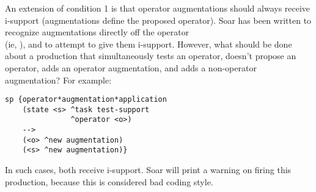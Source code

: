 An extension of condition 1 is that operator augmentations should always receive i-support (augmentations define the proposed operator). Soar has been written to recognize augmentations directly off the operator \\
(ie, ), and to attempt to give them i-support. However, what should be done about a production that simultaneously tests an operator, doesn't propose an operator, adds an operator augmentation, and adds a non-operator augmentation? For example:

\begin{verbatim}
sp {operator*augmentation*application
    (state <s> ^task test-support
               ^operator <o>)
    -->
    (<o> ^new augmentation)
    (<s> ^new augmentation)}
\end{verbatim}


In such cases, both receive i-support. Soar will print a warning on firing this production, because this is considered bad coding style.

